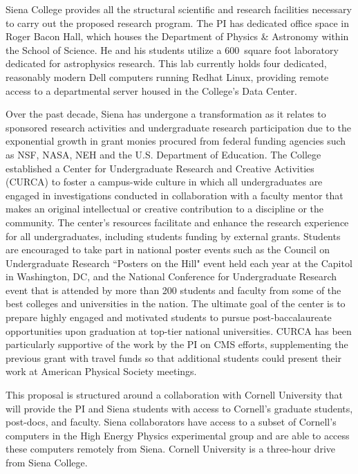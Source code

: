 \documentclass[11pt]{article}
\begin{document}
Siena College provides all the structural scientific and research facilities
necessary to carry out the proposed research program.  The PI has dedicated
office space in Roger Bacon Hall, which houses the Department of Physics \&
Astronomy within the School of Science.  He and his students utilize a
$600$~square foot laboratory dedicated for astrophysics research.  This lab
currently holds four dedicated, reasonably modern Dell computers running Redhat
Linux, providing remote access to a departmental server housed in the College's
Data Center.  


Over the past decade, Siena has undergone a transformation as it relates to sponsored research activities and 
undergraduate research participation due to the exponential growth in grant monies procured from federal funding agencies 
such as NSF, NASA, NEH and the U.S. Department of Education.  The College established a Center for 
Undergraduate Research and Creative Activities (CURCA) to foster a campus-wide culture in which all undergraduates are engaged in 
investigations conducted in collaboration with a faculty mentor that makes an original intellectual or creative contribution 
to a discipline or the community. The center's resources facilitate and enhance the research experience for all undergraduates, 
including students funding by external grants. Students are encouraged to take part in national poster events such as the 
Council on Undergraduate Research ``Posters on the Hill" event held each year at the Capitol in Washington, DC, and the 
National Conference for Undergraduate Research event that is attended by more than 200 students and faculty from some of 
the best colleges and universities in the nation. The ultimate goal of the center is to prepare highly engaged and 
motivated students to pursue post-baccalaureate opportunities upon graduation at top-tier national universities. 
CURCA has been particularly supportive of the work by the PI on CMS efforts, supplementing 
the previous grant with travel funds so that additional students could present their work at 
American Physical Society meetings.

This proposal is structured around a collaboration with Cornell University that will 
provide the PI and Siena students with access to Cornell's graduate students,
post-docs, and faculty. Siena collaborators have access to a subset of
Cornell's computers in the High Energy Physics experimental group and are
able to access these computers remotely from Siena.
Cornell University is a three-hour drive from Siena College.
\end{document}
